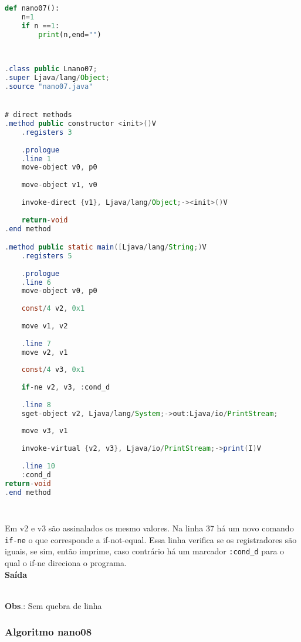 \documentclass[hidelinks,12pt]{article}
\begin{document}
	\begin{lstlisting}[caption=Código em python,language=Python]
def nano07():
	n=1
	if n ==1:
		print(n,end="")
	
	
	\end{lstlisting}
	
	\begin{lstlisting}[caption=Smali resultante do .java,language=java]
.class public Lnano07;
.super Ljava/lang/Object;
.source "nano07.java"


# direct methods
.method public constructor <init>()V
	.registers 3
	
	.prologue
	.line 1
	move-object v0, p0
	
	move-object v1, v0
	
	invoke-direct {v1}, Ljava/lang/Object;-><init>()V
	
	return-void
.end method

.method public static main([Ljava/lang/String;)V
	.registers 5
	
	.prologue
	.line 6
	move-object v0, p0
	
	const/4 v2, 0x1
	
	move v1, v2
	
	.line 7
	move v2, v1
	
	const/4 v3, 0x1
	
	if-ne v2, v3, :cond_d
	
	.line 8
	sget-object v2, Ljava/lang/System;->out:Ljava/io/PrintStream;
	
	move v3, v1
	
	invoke-virtual {v2, v3}, Ljava/io/PrintStream;->print(I)V
	
	.line 10
	:cond_d
return-void
.end method	
	
	
	\end{lstlisting}
	
	Em v2 e v3 são assinalados os mesmo valores. Na linha 37 há um novo comando \texttt{if-ne} o que corresponde a if-not-equal. Essa linha verifica se os registradores são iguais, se sim, então imprime, caso contrário há um marcador \texttt{:cond\_d} para o qual o if-ne direciona o programa.\\
	
	
	{\large{\textbf{Saída}}}
	
	\noindent{}\\	
	
	\textbf{Obs}.: Sem quebra de linha\\	
	
	\subsubsection{Algoritmo nano08}
	
\end{document}
